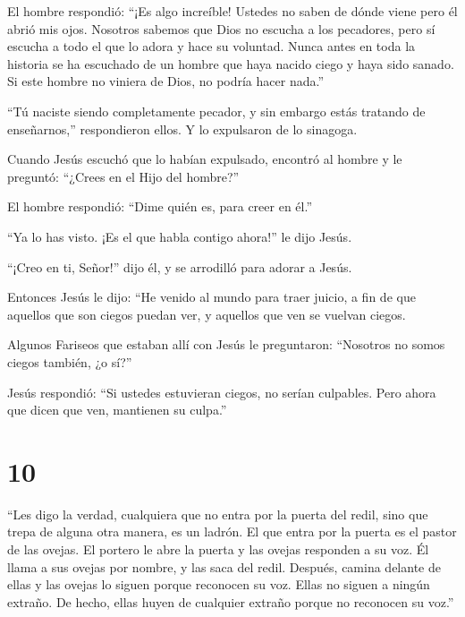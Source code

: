  El hombre respondió: ``¡Es algo increíble! Ustedes no
saben de dónde viene pero él abrió mis ojos.  Nosotros
sabemos que Dios no escucha a los pecadores, pero sí escucha a todo el
que lo adora y hace su voluntad.  Nunca antes en toda la
historia se ha escuchado de un hombre que haya nacido ciego y haya sido
sanado.  Si este hombre no viniera de Dios, no podría hacer
nada.''

 ``Tú naciste siendo completamente pecador, y sin embargo
estás tratando de enseñarnos,'' respondieron ellos. Y lo expulsaron de
lo sinagoga.

 Cuando Jesús escuchó que lo habían expulsado, encontró al
hombre y le preguntó: ``¿Crees en el Hijo del hombre?''

 El hombre respondió: ``Dime quién es, para creer en él.''

 ``Ya lo has visto. ¡Es el que habla contigo ahora!'' le
dijo Jesús.

 ``¡Creo en ti, Señor!'' dijo él, y se arrodilló para
adorar a Jesús.

 Entonces Jesús le dijo: ``He venido al mundo para traer
juicio, a fin de que aquellos que son ciegos puedan ver, y aquellos que
ven se vuelvan ciegos.

 Algunos Fariseos que estaban allí con Jesús le
preguntaron: ``Nosotros no somos ciegos también, ¿o sí?''

 Jesús respondió: ``Si ustedes estuvieran ciegos, no serían
culpables. Pero ahora que dicen que ven, mantienen su culpa.''

\hypertarget{section-9}{%
\section{10}\label{section-9}}

 ``Les digo la verdad, cualquiera que no entra por la puerta
del redil, sino que trepa de alguna otra manera, es un ladrón.
 El que entra por la puerta es el pastor de las ovejas.
 El portero le abre la puerta y las ovejas responden a su
voz. Él llama a sus ovejas por nombre, y las saca del redil.
 Después, camina delante de ellas y las ovejas lo siguen
porque reconocen su voz.  Ellas no siguen a ningún extraño.
De hecho, ellas huyen de cualquier extraño porque no reconocen su voz.''

